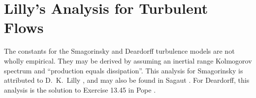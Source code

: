 

\chapter{Lilly's Analysis for Turbulent Flows}
\label{app:lilly_analysis}

The constants for the Smagorinsky and Deardorff turbulence models are not wholly empirical.  They may be derived by assuming an inertial range Kolmogorov spectrum and ``production equals dissipation''.  This analysis for Smagorinsky is attributed to D.~K.~Lilly \cite{Lilly:1967}, and may also be found in Sagaut \cite{Sagaut:2001}.  For Deardorff, this analysis is the solution to Exercise 13.45 in Pope \cite{Pope:2000}.


